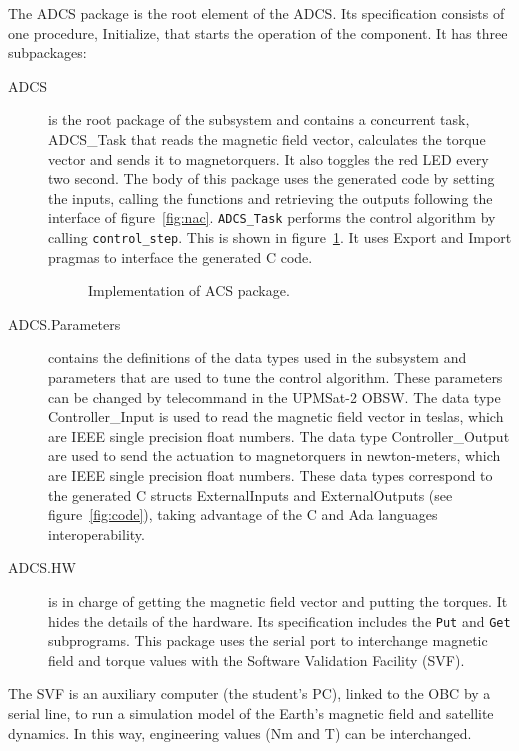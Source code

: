 The ADCS package is the root element of the ADCS. Its specification consists of one procedure, Initialize, that starts the operation of the component. It has three subpackages:
\begin{description}
\item[ADCS] is the root package of the subsystem and contains a concurrent task, ADCS\_Task that reads the magnetic field vector, calculates the torque vector and sends it to magnetorquers. It also toggles the red LED every two second.
The body of this package uses the generated code by setting the inputs, calling the functions and retrieving the outputs following the interface of figure~\ref{fig:nac}.
\texttt{ADCS\_Task} performs the control algorithm by calling \texttt{control\_step}.
This is shown in figure~\ref{fig:acs-body}.
It uses Export and Import pragmas to interface the generated C code.

\begin{figure}[h]
            \caption{Implementation of ACS package.}
            \label{fig:acs-body}
\end{figure}

\item[ADCS.Parameters] contains the definitions of the data types used in the subsystem and parameters that are used to tune the control algorithm. These parameters can be changed by telecommand in the UPMSat-2 OBSW. The data type Controller\_Input is used to read the magnetic field vector in teslas, which are IEEE single precision float numbers. The data type Controller\_Output are used to send the actuation to magnetorquers in newton-meters, which are IEEE single precision float numbers. These data types correspond to the generated C structs ExternalInputs and ExternalOutputs (see figure~\ref{fig:code}), taking advantage of the C and Ada languages interoperability.

\item[ADCS.HW] is in charge of getting the magnetic field vector and putting the
torques. It hides the details of the hardware. Its specification includes the \texttt{Put} and \texttt{Get} subprograms.
This package uses the serial port to interchange magnetic field and torque values with the Software Validation Facility (SVF).
\end{description}

The SVF is an auxiliary computer (the student's PC),
linked to the OBC by a serial line, to run a simulation model of the Earth's magnetic field and satellite dynamics. In this way, engineering values (Nm and T) can be interchanged.

